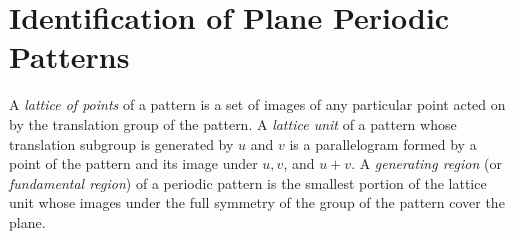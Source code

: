 \section{Identification of Plane Periodic Patterns}

\begin{remark}
	A \textit{lattice of points} of a pattern is a set of images of any particular point acted on by the translation group of the pattern. A \textit{lattice unit} of a pattern whose translation subgroup is generated by $u$ and $v$ is a parallelogram formed by a point of the pattern and its image under $u,v$, and $u + v$. A \textit{generating region} (or \textit{fundamental region}) of a periodic pattern is the smallest portion of the lattice unit whose images under the full symmetry of the group of the pattern cover the plane.
\end{remark}

